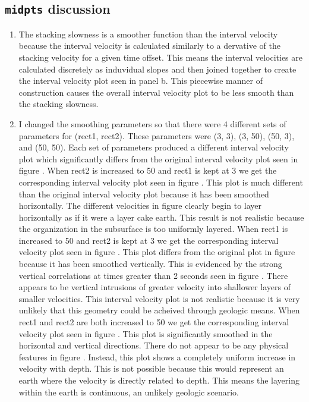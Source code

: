 \subsection{\texttt{midpts} discussion}
\begin{enumerate}

  \item The stacking slowness is a smoother function than the interval velocity because the interval velocity is calculated similarly to a dervative of the stacking velocity for a given time offset. This means the interval velocities are calculated discretely as induvidual slopes and then joined together to create the interval velocity plot seen in panel b. This piecewise manner of construction causes the overall interval velocity plot to be less smooth than the stacking slowness.


  \item I changed the smoothing parameters so that there were 4 different sets of parameters for (rect1, rect2). These parameters were (3, 3), (3, 50), (50, 3), and (50, 50). Each set of parameters produced a different interval velocity plot which significantly differs from the original interval velocity plot seen in figure . When rect2 is increased to 50 and rect1 is kept at 3 we get the corresponding interval velocity plot seen in figure . This plot is much different than the original interval velocity plot because it has been smoothed horizontally. The different velocities in figure  clearly begin to layer horizontally as if it were a layer cake earth. This result is not realistic because the organization in the subsurface is too uniformly layered. When rect1 is increased to 50 and rect2 is kept at 3 we get the corresponding interval velocity plot seen in figure . This plot differs from the original plot in figure  because it has been smoothed vertically. This is evidenced by the strong vertical correlations at times greater than 2 seconds seen in figure . There appears to be vertical intrusions of greater velocity into shallower layers of smaller velocities. This interval velocity plot is not realistic because it is very unlikely that this geometry could be acheived through geologic means. When rect1 and rect2 are both increased to 50 we get the corresponding interval velocity plot seen in figure . This plot is significantly smoothed in the horizontal and vertical directions. There do not appear to be any physical features in figure . Instead, this plot shows a completely uniform increase in velocity with depth. This is not possible because this would represent an earth where the velocity is directly related to depth. This means the layering within the earth is continuous, an unlikely geologic scenario.




\end{enumerate}
